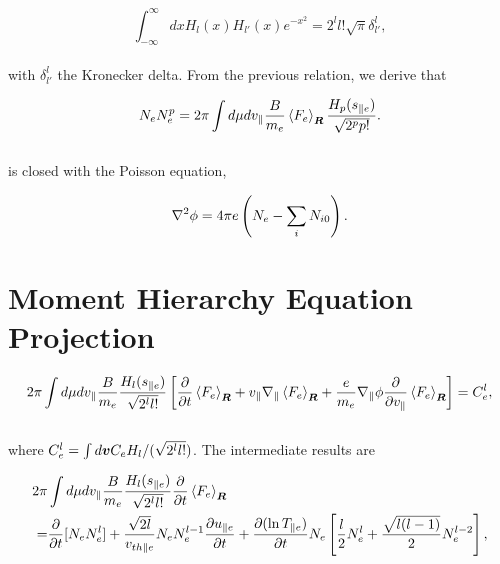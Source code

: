 \documentclass[final]{jpp}
\begin{document}
\begin{equation} \label{eq:Hermiteorthogonality}
    \int_{-\infty}^\infty d x H_l(x) H_{l'}(x) e^{-x^2} = 2^l l! \sqrt{\pi} \delta^l_{l'},
\end{equation}
\\
with $\delta_{l'}^l$ the Kronecker delta. From the previous relation, we derive that 

\begin{equation}
N_e N_e^p = 2 \pi \int d \mu d v_{\parallel} \frac{B}{m_e} \left< F_e \right>_{\bm{R}} \frac{H_p(s_{\parallel e})}{\sqrt{2^p p!}}.
\end{equation}
\\
 is closed with the Poisson equation,

\begin{align}
\nabla^2 \phi = 4 \pi e \left( N_{e} - \sum_iN_{i0}\right).
\end{align}


\section{Moment Hierarchy Equation Projection}

\begin{align}
2 \pi \int d \mu d v_{\parallel} \frac{B}{m_e}\frac{H_l(s_{\parallel e})}{\sqrt{2^l l!}} \left[ \frac{\partial}{\partial t} \left< F_e \right>_{\bm{R}} + v_\parallel \nabla_\parallel \left< F_e \right>_{\bm{R}} + \frac{e}{m_e} \nabla_\parallel \phi \frac{\partial }{ \partial v_{\parallel}} \left< F_e \right>_{\bm{R}} \right] =C_e^l,
\end{align}
\\
where $C_e^l = \int d \bm{v} C_e H_l/(\sqrt{2^ll!})$. The intermediate results are 

\begin{align}
2 \pi &\int d \mu d v_{\parallel} \frac{B}{m_e}\frac{H_l(s_{\parallel e})}{\sqrt{2^l l!}} \frac{\partial}{\partial t} \left< F_e \right>_{\bm{R}}  \nonumber \\
=&\frac{\partial}{\partial t}[N_e N_e^l]
+ \frac{\sqrt{2l}}{v_{th \parallel e}}  N_e N_e^{l-1} \frac{\partial u_{\parallel e}}{\partial t}
+ \frac{\partial (\ln T_{\parallel e})}{\partial t}  N_e \left[ \frac{l}{2}N_e^l+ \frac{\sqrt{l(l-1)}}{2}N_e^{l-2} \right],
\end{align}
\end{document}
